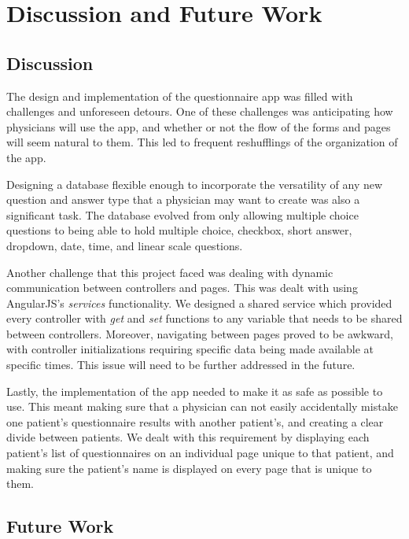 \documentclass{higrep}
\begin{document}

\chapter{Discussion and Future Work}\label{Sec:DiscussionAndFutureWork}

\section{Discussion}\label{Sec:Discussion}

The design and implementation of the questionnaire app was filled with challenges and unforeseen detours. One of these challenges was anticipating how physicians will use the app, and whether or not the flow of the forms and pages will seem natural to them. This led to frequent reshufflings of the organization of the app. 

Designing a database flexible enough to incorporate the versatility of any new question and answer type that a physician may want to create was also a significant task. The database evolved from only allowing multiple choice questions to being able to hold multiple choice, checkbox, short answer, dropdown, date, time, and linear scale questions.

Another challenge that this project faced was dealing with dynamic communication between controllers and pages. This was dealt with using AngularJS's \textit{services} functionality. We designed a shared service which provided every controller with \textit{get} and \textit{set} functions to any variable that needs to be shared between controllers. Moreover, navigating between pages proved to be awkward, with controller initializations requiring specific data being made available at specific times. This issue will need to be further addressed in the future.

Lastly, the implementation of the app needed to make it as safe as possible to use. This meant making sure that a physician can not easily accidentally mistake one patient's questionnaire results with another patient's, and creating a clear divide between patients. We dealt with this requirement by displaying each patient's list of questionnaires on an individual page unique to that patient, and making sure the patient's name is displayed on every page that is unique to them.

\section{Future Work}
\end{document}
